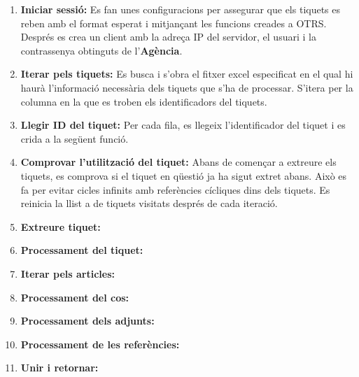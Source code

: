 \begin{enumerate}
     \item \textbf{Iniciar sessió:} Es fan unes configuracions per assegurar que els tiquets es reben amb el format esperat i mitjançant les funcions creades a OTRS. Després es crea un client amb la adreça IP del servidor, el usuari i la contrassenya obtinguts de l'\textbf{Agència}.
     \item \textbf{Iterar pels tiquets:} Es busca i s'obra el fitxer excel especificat en el qual hi haurà l'informació necessària dels tiquets que s'ha de processar. S'itera per la columna en la que es troben els identificadors del tiquets.
     \item \textbf{Llegir ID del tiquet:} Per cada fila, es llegeix l'identificador del tiquet i es crida a la següent funció.
     \item \textbf{Comprovar l'utilització del tiquet:} Abans de començar a extreure els tiquets, es comprova si el tiquet en qüestió ja ha sigut extret abans. Això es fa per evitar cicles infinits amb referències cícliques dins dels tiquets. Es reinicia la llist a de tiquets visitats després de cada iteració.
     \item \textbf{Extreure tiquet:}
     \item \textbf{Processament del tiquet:}
     \item \textbf{Iterar pels articles:}
     \item \textbf{Processament del cos:}
     \item \textbf{Processament dels adjunts:}
     \item \textbf{Processament de les referències:}
     \item \textbf{Unir i retornar:}
\end{enumerate}


